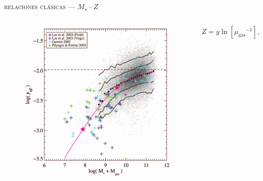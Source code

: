 \documentclass[xcolor=dvipsnames,fleqn,hyperref={colorlinks,citecolor=black,linkcolor=black,urlcolor=black}]{beamer}
\begin{document}
\begin{frame}{\textsc{relaciones clásicas --- $M_\star\,$--$\,Z$}}

\begin{columns}
\begin{figure}
\includegraphics[scale=0.7]{img/tremonti2004-8}
\end{figure}


%
$$Z = y\ln{\left[{\mu_\text{gas}}^{-1}\right]},$$
%


\end{columns}
\end{frame}
\end{document}
